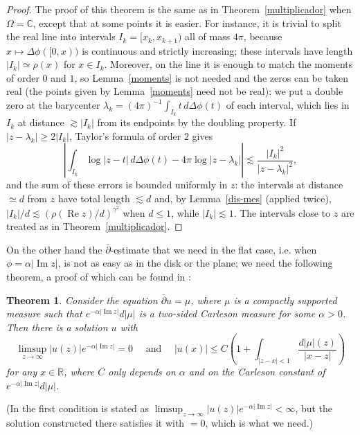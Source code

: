 \documentclass[12pt,twoside,final,psamsfonts]{amsart}
\theoremstyle{plain}
\newtheorem*{teor*}{Theorem}
\theoremstyle{remark}
\theoremstyle{definition}
\newcommand{\C}{{\mathbb C}}
\newcommand{\R}{{\mathbb R}}
\newcommand{\dbar}{\bar\partial}
\renewcommand{\Re}{\operatorname{Re}}
\renewcommand{\Im}{\operatorname{Im}}
\begin{document}
\begin{proof} 
The proof of this theorem is the same as in Theorem~\ref{multiplicador} when
$\Omega=\C$,  except that at some points it is easier. For instance, it is
trivial to split the real line into intervals $I_k=[x_k,x_{k+1})$ all of mass
$4\pi$, because $x\mapsto\Delta\phi([0,x))$ is continuous and strictly
increasing; these intervals have length $|I_k|\simeq\rho(x)$ for $x\in I_k$.
Moreover, on the line it is enough to match the moments of order $0$ and $1$,
so Lemma~\ref{moments} is not needed and the zeros can be taken real (the
points given by Lemma~\ref{moments} need not be real): we put a double
zero at the barycenter $\lambda_k=(4\pi)^{-1}\int_{I_k}t\,d\Delta\phi(t)$ of each
interval, which lies in $I_k$ at distance $\gtrsim|I_k|$ from its endpoints by
the doubling property. If $|z-\lambda_k|\ge 2|I_k|$, Taylor's formula of order
$2$ gives
\[
\left|\int_{I_k}\log|z-t|\,d\Delta\phi(t)-4\pi\log|z-\lambda_k|\right|\lesssim
\frac{|I_k|^2}{|z-\lambda_k|^2},
\]
and the sum of these errors is bounded uniformly in $z$: the intervals at
distance $\simeq d$ from $z$ have total length $\lesssim d$ and, by
Lemma~\ref{dis-mes} (applied twice), $|I_k|/d\lesssim(\rho(\Re z)/d)^{\gamma^2}$ when $d\le 1$,
while $|I_k|\lesssim 1$. The intervals close to $z$ are treated as in
Theorem~\ref{multiplicador}.
\end{proof}

On the other hand the $\dbar$-estimate that we need in the flat case, i.e. when
$\phi=\alpha |\Im z|$, is not as easy as in the disk or the plane; we need the
following theorem, a proof of which can be found in \cite{OrtSei99}:

\begin{teor*}
Consider the equation $\dbar u=\mu$, where $\mu$ is a compactly supported
measure such that $e^{-\alpha|\Im z|}d|\mu|$ is
a two-sided  Carleson measure for some $\alpha>0$. 
Then there is a solution $u$ with
\[
\limsup_{z\to\infty} |u(z)|e^{-\alpha|\Im z|}=0 \quad \text{ and } \quad
|u(x)|\le C \left(1+ \int_{|z-x|<1}\frac {d|\mu|(z)}{|x-z|}\right)
\]
for any $x\in \R$, where $C$ only depends on $\alpha$ and on the Carleson constant of 
$e^{-\alpha|\Im z|}d|\mu|$. 
\end{teor*}
(In \cite[Lemma~4]{OrtSei99} the first condition is stated as
$\limsup_{z\to\infty}|u(z)|e^{-\alpha|\Im z|}<\infty$, but the solution
constructed there satisfies it with $=0$, which is what we need.)
\end{document}
